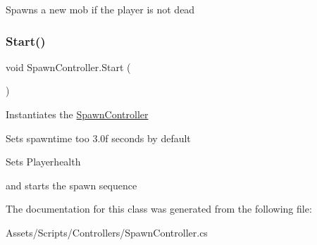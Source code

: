 Spawns a new mob if the player is not dead \mbox{\label{class_spawn_controller_a5aa835725a1507e10580c9887069f243}} 
\subsubsection{\texorpdfstring{Start()}{Start()}}
{\footnotesize\ttfamily void Spawn\+Controller.\+Start (\begin{DoxyParamCaption}{ }\end{DoxyParamCaption})\hspace{0.3cm}{\ttfamily [private]}}

Instantiates the \hyperlink{class_spawn_controller}{Spawn\+Controller}
\begin{DoxyItemize}
\item Sets spawntime too 3.\+0f seconds by default
\item Sets Playerhealth
\item and starts the spawn sequence 
\end{DoxyItemize}

The documentation for this class was generated from the following file\+:\begin{DoxyCompactItemize}
\item 
Assets/\+Scripts/\+Controllers/Spawn\+Controller.\+cs\end{DoxyCompactItemize}

